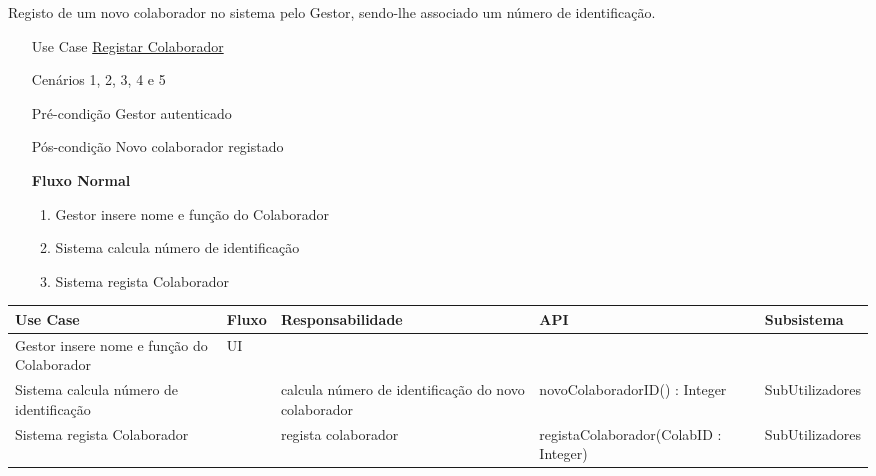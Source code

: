 \documentclass[../relatorio.tex]{subfiles}
\begin{document}
Registo de um novo colaborador no sistema pelo Gestor, sendo-lhe associado um número de identificação.
\begin{itemize}
    \item[Use Case] {\underline{Registar Colaborador}}
    \item[Cenários] {1, 2, 3, 4 e 5} 
    \item[Pré-condição] {Gestor autenticado}
    \item[Pós-condição] {Novo colaborador registado}
            \begin{flushleft}
                \textbf{Fluxo Normal}
            \end{flushleft}
            \begin{enumerate}
                \item Gestor insere nome e função do Colaborador
                \item Sistema calcula número de identificação
                \item Sistema regista Colaborador
            \end{enumerate}
\end{itemize}
\begin{landscape}
    \begin{table}[!h]
        \centering
        \begin{tabular}{|p{5cm}|p{1cm}|p{4cm}|p{6cm}|p{3cm}|}
            \hline
            \rowcolor{gray!20!white}
            Use Case & Fluxo                                            & Responsabilidade & API & Subsistema \\
            \hline
            \rowcolor{yellow}
            Gestor insere nome e função do Colaborador
                     & UI
                     & 
                     & 
                     & 
            \\
            \hline
            Sistema calcula número de identificação
                     & 
                     & calcula número de identificação do novo colaborador
                     & novoColaboradorID() : Integer
                     & SubUtilizadores
            \\
            \hline
            Sistema regista Colaborador
                     & 
                     & regista colaborador
                     & registaColaborador(ColabID : Integer)
                     & SubUtilizadores
            \\
            \hline
        \end{tabular}
    \end{table}
\end{landscape}
\end{document}
